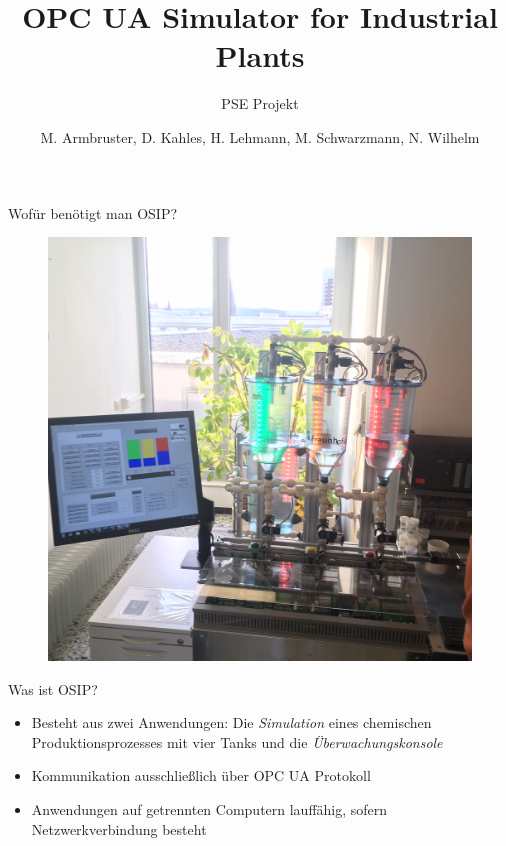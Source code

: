 \documentclass[22pt]{beamer}
\title[OSIP]{OPC UA Simulator for Industrial Plants}
\subtitle{PSE Projekt}
\author{M. Armbruster, D. Kahles, H. Lehmann, M. Schwarzmann, N. Wilhelm}
\begin{document}

\begin{frame}
\titlepage
\end{frame}

\begin{frame}{Wofür benötigt man OSIP?}
\begin{figure}[ht!]
\centering
\includegraphics[height=\textheight,width=\textwidth,keepaspectratio=true]{Demoanlage_IOSB.jpg}
\end{figure}
\end{frame}

\begin{frame}{Was ist OSIP?}
\begin{itemize}[<+->]
 \item Besteht aus zwei Anwendungen: Die \emph{Simulation} eines chemischen Produktionsprozesses mit vier Tanks und die \emph{Überwachungskonsole}
 \item Kommunikation ausschließlich über OPC UA Protokoll
 \item Anwendungen auf getrennten Computern lauffähig, sofern Netzwerkverbindung besteht
\end{itemize}
\end{frame}
\end{document}
